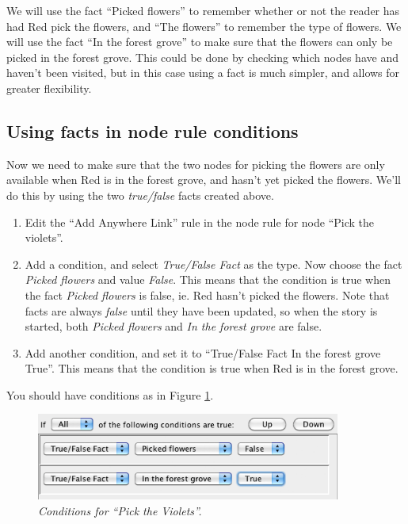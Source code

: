 \documentclass{article}
\begin{document}
We will use the fact ``Picked flowers'' to remember whether or not the reader has
had Red pick the flowers, and ``The flowers'' to remember the type of flowers. We
will use the fact ``In the forest grove'' to make sure that the flowers can only
be picked in the forest grove. This could be done by checking which nodes have
and haven't been visited, but in this case using a fact is much simpler, and
allows for greater flexibility.

\subsection{Using facts in node rule conditions}

Now we need to make sure that the two nodes for picking the flowers are only
available when Red is in the forest grove, and hasn't yet picked the flowers.
We'll do this by using the two \textit{true/false} facts created above.

\begin{enumerate}
  \item Edit the ``Add Anywhere Link'' rule in the node rule for node ``Pick the
  violets''.
  \item Add a condition, and select \textit{True/False Fact} as the type. Now
  choose the fact \textit{Picked flowers} and value \textit{False}. This means
  that the condition is true when the fact \textit{Picked flowers} is false,
  ie. Red hasn't picked the flowers. Note that facts are always \textit{false}
  until they have been updated, so when the story is started, both
  \textit{Picked flowers} and \textit{In the forest grove} are false.
  \item Add another condition, and set it to ``True/False Fact In the forest
  grove True''. This means that the condition is true when Red is in the
  forest grove.
\end{enumerate}

You should have conditions as in Figure \ref{fig:tut3:picktheviolets}.

\begin{figure}[h]
  \centering
  \includegraphics[width=10cm]{images/hypedyn-tutorial-3-figure-10}
  \caption{\textit{Conditions for ``Pick the Violets''.}}
  \label{fig:tut3:picktheviolets}
\end{figure}
\end{document}
